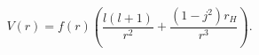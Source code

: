 \begin{equation}  \label{schwarzschild-4d-potential}
V(r) = f(r) \left( \frac{l(l+1)}{r^2} + \frac{(1-j^2)r_H}{r^3} \right).
\end{equation}

